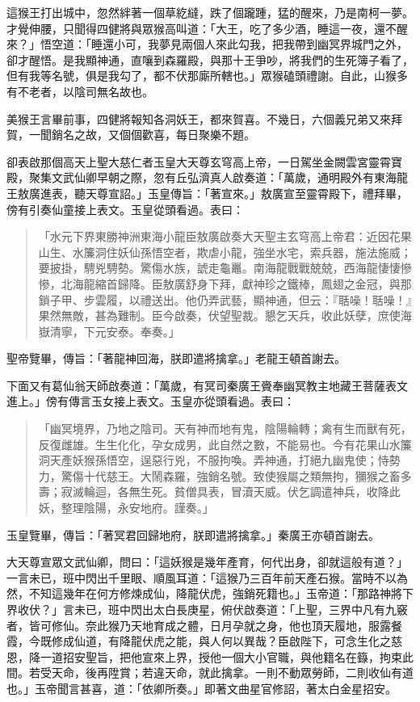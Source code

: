 這猴王打出城中，忽然絆著一個草紇繨，跌了個躘踵，猛的醒來，乃是南柯一夢。才覺伸腰，只聞得四健將與眾猴高叫道：「大王，吃了多少酒，睡這一夜，還不醒來？」悟空道：「睡還小可，我夢見兩個人來此勾我，把我帶到幽冥界城門之外，卻才醒悟。是我顯神通，直嚷到森羅殿，與那十王爭吵，將我們的生死簿子看了，但有我等名號，俱是我勾了，都不伏那廝所轄也。」眾猴磕頭禮謝。自此，山猴多有不老者，以陰司無名故也。

美猴王言畢前事，四健將報知各洞妖王，都來賀喜。不幾日，六個義兄弟又來拜賀，一聞銷名之故，又個個歡喜，每日聚樂不題。

卻表啟那個高天上聖大慈仁者玉皇大天尊玄穹高上帝，一日駕坐金闕雲宮靈霄寶殿，聚集文武仙卿早朝之際，忽有丘弘濟真人啟奏道：「萬歲，通明殿外有東海龍王敖廣進表，聽天尊宣詔。」玉皇傳旨：「著宣來。」敖廣宣至靈霄殿下，禮拜畢，傍有引奏仙童接上表文。玉皇從頭看過。表曰：
\begin{quote}
「水元下界東勝神洲東海小龍臣敖廣啟奏大天聖主玄穹高上帝君：近因花果山生、水簾洞住妖仙孫悟空者，欺虐小龍，強坐水宅，索兵器，施法施威；要披掛，騁兇騁勢。驚傷水族，諕走龜鼉。南海龍戰戰兢兢，西海龍悽悽慘慘，北海龍縮首歸降。臣敖廣舒身下拜，獻神珍之鐵棒，鳳翅之金冠，與那鎖子甲、步雲履，以禮送出。他仍弄武藝，顯神通，但云：『聒噪！聒噪！』果然無敵，甚為難制。臣今啟奏，伏望聖裁。懇乞天兵，收此妖孽，庶使海嶽清寧，下元安泰。奉奏。」
\end{quote}

聖帝覽畢，傳旨：「著龍神回海，朕即遣將擒拿。」老龍王頓首謝去。

下面又有葛仙翁天師啟奏道：「萬歲，有冥司秦廣王賫奉幽冥教主地藏王菩薩表文進上。」傍有傳言玉女接上表文。玉皇亦從頭看過。表曰：
\begin{quote}
「幽冥境界，乃地之陰司。天有神而地有鬼，陰陽輪轉；禽有生而獸有死，反復雌雄。生生化化，孕女成男，此自然之數，不能易也。今有花果山水簾洞天產妖猴孫悟空，逞惡行兇，不服拘喚。弄神通，打絕九幽鬼使；恃勢力，驚傷十代慈王。大鬧森羅，強銷名號。致使猴屬之類無拘，獼猴之畜多壽；寂滅輪迴，各無生死。貧僧具表，冒瀆天威。伏乞調遣神兵，收降此妖，整理陰陽，永安地府。謹奏。」
\end{quote}

玉皇覽畢，傳旨：「著冥君回歸地府，朕即遣將擒拿。」秦廣王亦頓首謝去。

大天尊宣眾文武仙卿，問曰：「這妖猴是幾年產育，何代出身，卻就這般有道？」一言未已，班中閃出千里眼、順風耳道：「這猴乃三百年前天產石猴。當時不以為然，不知這幾年在何方修煉成仙，降龍伏虎，強銷死籍也。」玉帝道：「那路神將下界收伏？」言未已，班中閃出太白長庚星，俯伏啟奏道：「上聖，三界中凡有九竅者，皆可修仙。奈此猴乃天地育成之體，日月孕就之身，他也頂天履地，服露餐霞，今既修成仙道，有降龍伏虎之能，與人何以異哉？臣啟陛下，可念生化之慈恩，降一道招安聖旨，把他宣來上界，授他一個大小官職，與他籍名在籙，拘束此間。若受天命，後再陞賞；若違天命，就此擒拿。一則不動眾勞師，二則收仙有道也。」玉帝聞言甚喜，道：「依卿所奏。」即著文曲星官修詔，著太白金星招安。


